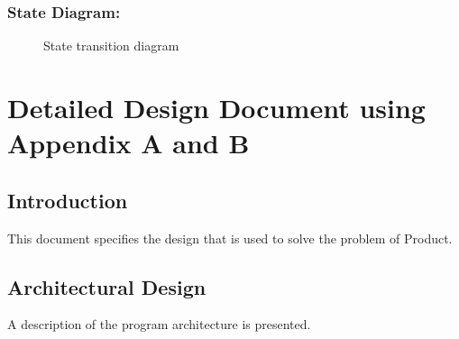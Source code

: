 \documentclass[oneside,a4paper,12pt]{book}
\begin{document}
\newpage
\subsection{State Diagram:}	
\begin{center}
	\begin{figure}[!htbp]
		\centering
		\caption{State transition diagram}
		\label{fig:state-dig}
	\end{figure}
\end{center} 



\chapter{Detailed Design Document using Appendix A and B}
 \section{Introduction}  
This document specifies the design that is used to solve the problem of Product.  
\section{Architectural Design}  
	A description of the program architecture is presented.
\end{document}
